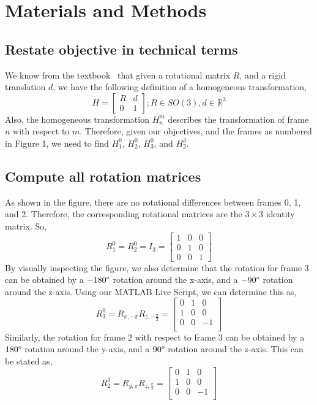 \documentclass[conference]{IEEEtran}
\begin{document}
\section{Materials and Methods}

\subsection{Restate objective in technical terms}

We know from the textbook~\cite{Spong2006} that given a rotational matrix $R$, and
a rigid translation $d$, we have the following definition of
a homogeneous transformation,
\[
    H = \begin{bmatrix}
        R & d\\
        0 & 1
    \end{bmatrix}; R \in SO(3), d \in \mathbb{R}^3
\]
Also, the homogeneous transformation $H^m_n$ describes the transformation
of frame $n$ with respect to $m$.
Therefore, given our objectives, and the frames as numbered in Figure 1, 
we need to find $H^0_1$, $H^0_2$, $H^0_3$, and $H^3_2$.

\subsection{Compute all rotation matrices}
As shown in the figure, there are no rotational differences between frames
0, 1, and 2. Therefore, the corresponding rotational matrices are the
$3 \times 3$ identity matrix. So,
\[
    R^0_1 = R^0_2 = I_3 = \begin{bmatrix}
        1 & 0 & 0\\
        0 & 1 & 0\\
        0 & 0 & 1
    \end{bmatrix}
\]
By visually inspecting the figure, we also determine that the rotation for frame 3
can be obtained by a $-180\degree$ rotation around the x-axis, and a
$-90\degree$ rotation around the z-axis. Using our MATLAB Live Script,
we can determine this as,
\[
    R^0_3 = R_{x,-\pi} R_{z,-\frac{\pi}{2}} = \begin{bmatrix}
        0 & 1 & 0\\
        1 & 0 & 0\\
        0 & 0 & -1\\
    \end{bmatrix}
\]
Similarly, the rotation for frame 2 with respect to frame 3 can be obtained
by a $180\degree$ rotation around the y-axis, and a $90\degree$ rotation around
the z-axis. This can be stated as,
\[
    R^3_2 = R_{y,\pi}R_{z,\frac{\pi}{2}} = \begin{bmatrix}
        0 & 1 & 0\\
        1 & 0 & 0\\
        0 & 0 & -1\\
    \end{bmatrix}
\]
\end{document}
